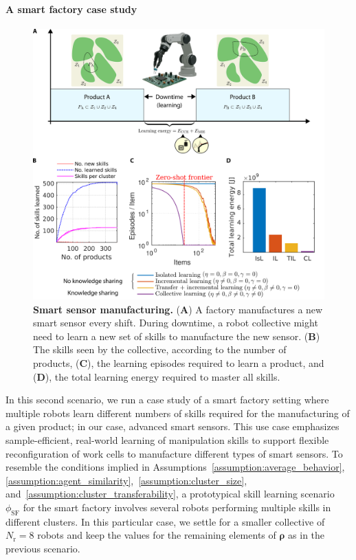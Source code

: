 \documentclass[12pt]{article}
\renewcommand{\emph}[1]{\textit{#1}}
\newcommand\mybox[2][]{\tikz[overlay]\node[fill=blue!100,inner sep=4pt, anchor=text, rectangle, rounded corners=1mm,#1] {#2};\phantom{#2}}
\newcommand{\TODO}[1]{\mybox[fill=yellow]{\textcolor{blue}{\warning~\Large \textbf{TODO}}:~\textcolor{blue}{\textbf{\emph{#1}}}}}
\begin{document}
\paragraph*{A smart factory case study}
\begin{figure}[t!]
	\centering
	\hspace*{\fill}
	\includegraphics[width=16cm]{smart_factory_case_study.png}
	\hspace*{\fill}
	\caption[] {\label{fig:smart_factory_case_study} \textbf{Smart sensor manufacturing.} {(\textbf{A}) A factory manufactures a new smart sensor every shift. During downtime, a robot collective might need to learn a new set of skills to manufacture the new sensor. (\textbf{B}) The skills seen by the collective, according to the number of products, (\textbf{C}), the learning episodes required to learn a product, and (\textbf{D}), the total learning energy required to master all skills. %
    }}
\end{figure}

In this second scenario, we run a case study of a smart factory setting where multiple robots learn different numbers of skills required for the manufacturing of a given product; in our case, advanced smart sensors. This use case emphasizes sample-efficient, real-world learning of manipulation skills to support flexible reconfiguration of work cells to manufacture different types of smart sensors. To resemble the conditions implied in Assumptions~\ref{assumption:average_behavior}, \ref{assumption:agent_similarity},~\ref{assumption:cluster_size}, and~\ref{assumption:cluster_transferability}, a prototypical skill learning scenario $\phi_\text{SF}$ for the smart  factory involves several robots performing multiple skills in different clusters. In this particular case, we settle for a smaller collective of $N_\mathrm{r} = 8$ robots and keep the values for the remaining elements of $ \bm{\rho} $ as in the previous scenario. 
\end{document}
